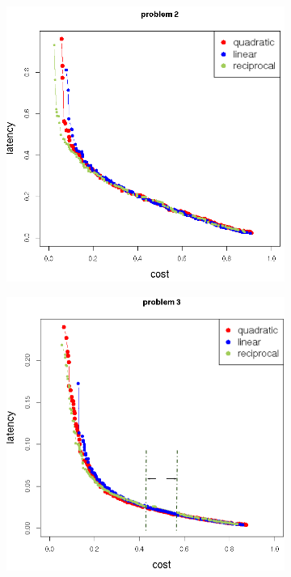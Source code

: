 \begin{figure}[h!]
   \centering
   \begin{subfigure}{0.49\textwidth}
       \includegraphics[width=\textwidth]{pics/dynamic_problem_2.png}
	   \caption{}
   \end{subfigure}
   \begin{subfigure}{0.49\textwidth}
       \includegraphics[width=\textwidth]{pics/dynamic_problem_3.png}

\end{subfigure}
\end{figure}
